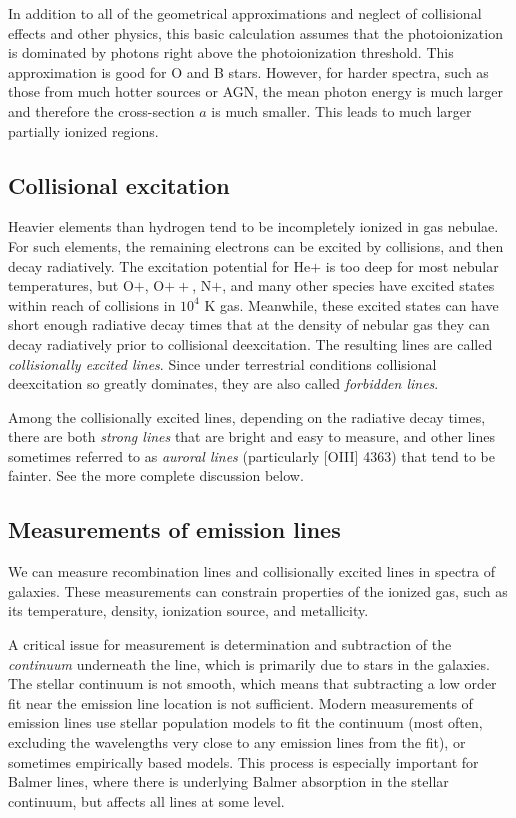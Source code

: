 In addition to all of the geometrical approximations and neglect of
collisional effects and other physics, this basic calculation assumes
that the photoionization is dominated by photons right above the
photoionization threshold. This approximation is good for O and B
stars. However, for harder spectra, such as those from much hotter
sources or AGN, the mean photon energy is much larger and therefore
the cross-section $a$ is much smaller. This leads to much larger
partially ionized regions.

\subsection{Collisional excitation}

Heavier elements than hydrogen tend to be incompletely ionized in gas
nebulae. For such elements, the remaining electrons can be excited by
collisions, and then decay radiatively. The excitation potential for
He$+$ is too deep for most nebular temperatures, but O$+$, O$++$,
N$+$, and many other species have excited states within reach of
collisions in $10^4$ K gas. Meanwhile, these excited states can have
short enough radiative decay times that at the density of nebular gas
they can decay radiatively prior to collisional deexcitation. The
resulting lines are called {\it collisionally excited lines}. Since
under terrestrial conditions collisional deexcitation so greatly
dominates, they are also called {\it forbidden lines}.

Among the collisionally excited lines, depending on the radiative
decay times, there are both {\it strong lines} that are bright and
easy to measure, and other lines sometimes referred to as {\it auroral
lines} (particularly [OIII] 4363) that tend to be fainter. See the
more complete discussion below.

\subsection{Measurements of emission lines}

We can measure recombination lines and collisionally excited lines in
spectra of galaxies.  These measurements can constrain properties of
the ionized gas, such as its temperature, density, ionization source,
and metallicity.

A critical issue for measurement is determination and subtraction of
the {\it continuum} underneath the line, which is primarily due to
stars in the galaxies. The stellar continuum is not smooth, which
means that subtracting a low order fit near the emission line location
is not sufficient. Modern measurements of emission lines use stellar
population models to fit the continuum (most often, excluding the
wavelengths very close to any emission lines from the fit), or
sometimes empirically based models.  This process is especially
important for Balmer lines, where there is underlying Balmer
absorption in the stellar continuum, but affects all lines at some
level.

